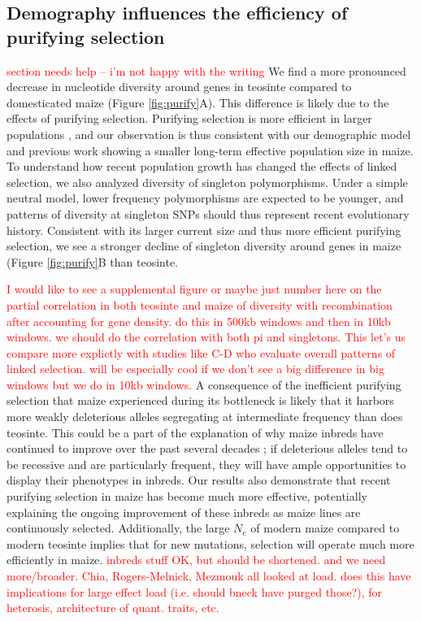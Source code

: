 \documentclass{pnastwo}
\newcommand{\jri}[1]{\textcolor{red}{\scriptsize #1}}
\begin{document}
\begin{article}
\subsection{Demography influences the efficiency of purifying selection}
\jri{section needs help --  i'm not happy with the writing} 
We find a more pronounced decrease in nucleotide diversity around genes in teosinte compared to domesticated maize (Figure \ref{fig:purify}A).
This difference is likely due to the effects of purifying selection.
Purifying selection is more efficient in larger populations  \cite{kimura1984}, and our observation is thus consistent with our demographic model and previous work \cite{eyre1998, tenaillon2004selection, wright2005, ross2009} showing a smaller long-term effective population size in maize.  
To understand how recent population growth has changed the effects of linked selection, we also analyzed diversity of singleton polymorphisms.   Under a simple neutral model, lower frequency polymorphisms are expected to be younger, and patterns of diversity at singleton SNPs should thus represent recent evolutionary history. 
Consistent with its larger current size and thus more efficient purifying selection, we see a stronger decline of singleton diversity around genes in maize (Figure \ref{fig:purify}B than teosinte.

\jri{I would like to see a supplemental figure or maybe just number here on the partial correlation in both teosinte and maize of diversity with recombination after accounting for gene density.  do this in 500kb windows and then in 10kb windows.  we should do the correlation with both pi and singletons.  This let's us compare more explictly with studies like C-D who evaluate overall patterns of linked selection. will be especially cool if we don't see a big difference in big windows but we do in 10kb windows.  }
A consequence of the inefficient purifying selection that maize experienced during its bottleneck is likely that it harbors more weakly deleterious alleles segregating at intermediate frequency than does teosinte. This could be a part of the explanation of why maize inbreds have continued to improve over the past several decades \cite{meghji1984}; if deleterious alleles tend to be recessive and are particularly frequent, they will have ample opportunities to display their phenotypes in inbreds. Our results also demonstrate that recent purifying selection in maize has become much more effective, potentially explaining the ongoing improvement of these inbreds as maize lines are continuously selected. Additionally, the large $N_e$ of modern maize compared to modern teosinte implies that for new mutations, selection will operate much more efficiently in maize. \jri{inbreds stuff OK, but should be shortened.  and we need more/broader. Chia, Rogers-Melnick, Mezmouk all looked at load. does this have implications for large effect load (i.e. should bneck have purged those?), for heterosis, architecture of quant. traits, etc.}


\end{article}
\end{document}
